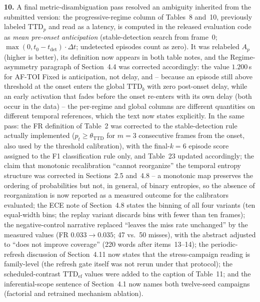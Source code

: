 \documentclass[1p,12pt,authoryear]{elsarticle}
\begin{document}
\vspace{2mm}
\noindent \textbf{10.} A final metric-disambiguation pass resolved an ambiguity inherited from the submitted version: the progressive-regime column of Tables~8 and~10, previously labeled $\mathrm{TTD}_p$ and read as a latency, is computed in the released evaluation code as \emph{mean pre-onset anticipation} (stable-detection search from frame~0; $\max(0, t_0 - t_{\mathrm{det}})\cdot\Delta t$; undetected episodes count as zero). It was relabeled $A_p$ (higher is better), its definition now appears in both table notes, and the Regime-asymmetry paragraph of Section~4.4 was corrected accordingly: the value $1.200$\,s for AF-TOI Fixed is anticipation, not delay, and -- because an episode still above threshold at the onset enters the global $\mathrm{TTD}_b$ with zero post-onset delay, while an early activation that fades before the onset re-enters with its own delay (both occur in the data) -- the per-regime and global columns are different quantities on different temporal references, which the text now states explicitly. In the same pass: the FR definition of Table~2 was corrected to the stable-detection rule actually implemented ($p_t \ge \theta_{\mathrm{TTD}}$ for $m{=}3$ consecutive frames from the onset, also used by the threshold calibration), with the final-$k{=}6$ episode score assigned to the F1 classification rule only, and Table~23 updated accordingly; the claim that monotonic recalibration ``cannot reorganize'' the temporal entropy structure was corrected in Sections~2.5 and~4.8 -- a monotonic map preserves the ordering of probabilities but not, in general, of binary entropies, so the absence of reorganization is now reported as a measured outcome for the calibrators evaluated; the ECE note of Section~4.8 states the binning of all four variants (ten equal-width bins; the replay variant discards bins with fewer than ten frames); the negative-control narrative replaced ``leaves the miss rate unchanged'' by the measured values (FR $0.033 \rightarrow 0.035$; 47 vs.\ 50 misses), with the abstract adjusted to ``does not improve coverage'' (220 words after items~13--14); the periodic-refresh discussion of Section~4.11 now states that the stress-campaign reading is family-level (the refresh gate itself was not rerun under that protocol); the scheduled-contrast $\mathrm{TTD}_{\mathrm{ef}}$ values were added to the caption of Table~11; and the inferential-scope sentence of Section~4.1 now names both twelve-seed campaigns (factorial and retrained mechanism ablation).
\end{document}
